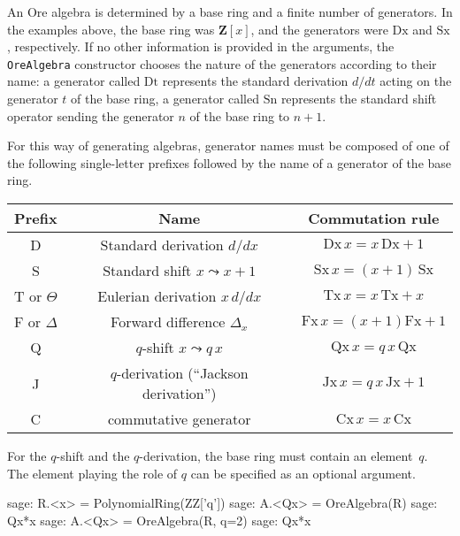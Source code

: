 \documentclass{llncs}
\def\Bold#1{\mathbf{#1}}
\begin{document}
An Ore algebra is determined by a base ring and a finite number of generators.
In the examples above, the base ring was $\Bold{Z}[x]$, and the generators were
$\mathrm{Dx}$ and $\mathrm{Sx}$, respectively. If no other information is provided
in the arguments, the \verb|OreAlgebra| constructor chooses the nature of the 
generators according to their name: a generator called $\mathrm{Dt}$ represents
the standard derivation $d/dt$ acting on the generator $t$ of the base ring, 
a generator called $\mathrm{Sn}$ represents the standard shift operator sending the
generator $n$ of the base ring to $n+1$. 

For this way of generating algebras, generator names must be composed of
one of the following single-letter prefixes followed by the name of a generator
of the base ring. 

\begin{center}
  \begin{tabular}{|c|c|c|}\hline
    Prefix & Name & Commutation rule \\\hline
     D & Standard derivation $d/dx$ & $\mathrm{Dx}\,x=x\,\mathrm{Dx}+1$ \\
     S & Standard shift $x\leadsto x+1$ & $\mathrm{Sx}\,x=(x+1)\,\mathrm{Sx}$ \\
     T or $\Theta$ & Eulerian derivation $x\,d/dx$ & $\mathrm{Tx}\,x=x\,\mathrm{Tx}+x$ \\
     F or $\Delta$ & Forward difference $\Delta_x$ & $\mathrm{Fx}\,x=(x+1)\mathrm{Fx}+1$ \\
     Q & $q$-shift $x\leadsto q\,x$ & $\mathrm{Qx}\,x=q\,x\,\mathrm{Qx}$ \\
     J & $q$-derivation (``Jackson derivation'') & $\mathrm{Jx}\,x=q\,x\,\mathrm{Jx}+1$ \\ 
     C & commutative generator & $\mathrm{Cx}\,x = x\,\mathrm{Cx}$ \\\hline
  \end{tabular}
\end{center}

For the $q$-shift and the $q$-derivation, the base ring must contain an element~$q$.
The element playing the role of $q$ can be specified as an optional argument. 

\begin{sageexample}
  sage: R.<x> = PolynomialRing(ZZ['q'])
  sage: A.<Qx> = OreAlgebra(R)
  sage: Qx*x
  sage: A.<Qx> = OreAlgebra(R, q=2)
  sage: Qx*x
\end{sageexample}
\end{document}
